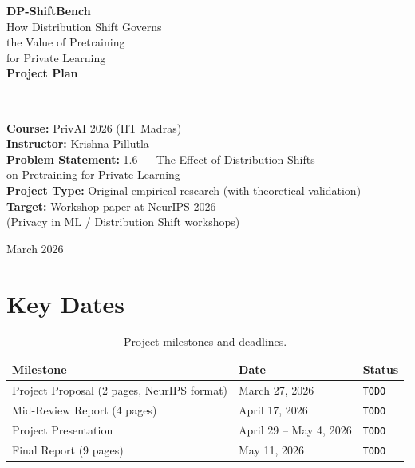 \documentclass[11pt,a4paper]{article}
\begin{document}
\begin{titlepage}
\centering
\vspace*{2cm}

{\Huge\bfseries DP-ShiftBench}\\[0.5cm]
{\LARGE How Distribution Shift Governs\\the Value of Pretraining\\for Private Learning}\\[2cm]

{\Large\textbf{Project Plan}}\\[1cm]

\rule{0.6\textwidth}{0.5pt}\\[1cm]

{\large
\textbf{Course:} PrivAI 2026 (IIT Madras)\\[0.3cm]
\textbf{Instructor:} Krishna Pillutla\\[0.3cm]
\textbf{Problem Statement:} 1.6 --- The Effect of Distribution Shifts\\on Pretraining for Private Learning\\[0.3cm]
\textbf{Project Type:} Original empirical research (with theoretical validation)\\[0.3cm]
\textbf{Target:} Workshop paper at NeurIPS 2026\\(Privacy in ML / Distribution Shift workshops)
}

\vfill

{\large March 2026}

\end{titlepage}

\tableofcontents
\newpage

\section{Key Dates}

\begin{table}[h]
\centering
\begin{tabular}{@{}lll@{}}
\toprule
\textbf{Milestone} & \textbf{Date} & \textbf{Status} \\
\midrule
Project Proposal (2 pages, NeurIPS format) & March 27, 2026 & \texttt{TODO} \\
Mid-Review Report (4 pages) & April 17, 2026 & \texttt{TODO} \\
Project Presentation & April 29 -- May 4, 2026 & \texttt{TODO} \\
Final Report (9 pages) & May 11, 2026 & \texttt{TODO} \\
\bottomrule
\end{tabular}
\caption{Project milestones and deadlines.}
\end{table}
\end{document}
